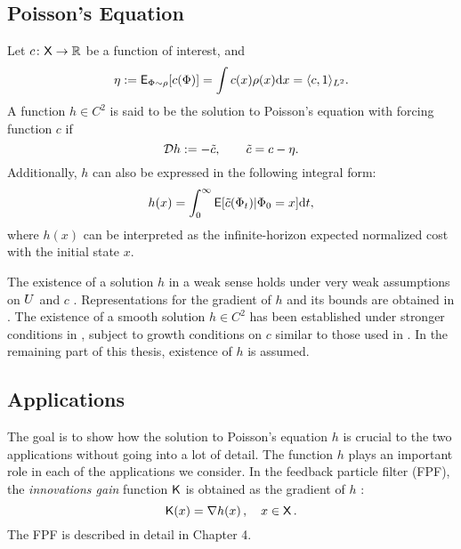 \subsection{Poisson's Equation}
Let $c \colon {\sf X} \to \mathbb{R}$ be a function of interest, and 
\begin{equation}
\eta := {\sf E}_{\Phi \sim \rho}[c(\Phi)] =  \int c(x) \rho(x) \text{d} x = \langle c, 1 \rangle_{L^2}.
\end{equation}
A function $h\in C^2$ is said to be the solution to Poisson's equation with forcing function $c$ if
\begin{equation}
\generate h := - \tilc, \qquad  \tilc = c - \eta.
\label{e:poissons}
\end{equation}
Additionally, $h$ can also be expressed in the following integral form:
\begin{equation}
h(x) =\int_0^\infty {\sf E}[\tilde c(\Phi_t)|\Phi_0 = x] \text{d} t,
\end{equation}
where $h(x)$ can be interpreted as the infinite-horizon expected normalized cost with the initial state $x$. 

The existence of a solution $h$ in a weak sense holds under very weak assumptions on $U$ and $c$  \cite{glymey96a,konmey12a}.   Representations for the gradient of $h$ and its bounds are obtained in \cite{laumehmeyrag15,devkonmey17b}.   The existence of  a  smooth solution $h\in C^2$ has been established under stronger conditions in \cite{parver01}, subject to growth conditions on $c$ similar to those used in  \cite{glymey96a}. In the remaining part of this thesis, existence of $h$ is assumed. 

\subsection{Applications} 
The goal is to show how the solution to Poisson's equation $h$ is crucial to the two applications without going into a lot of detail.  
The function $h$ plays an important role in each of the applications we consider. In the feedback particle filter (FPF), the \textit{innovations gain} function $\text{\sf K}$ is obtained as  the gradient of $h$ \cite{yanmehmey13}:
\begin{equation}
\kFPF (x) = \nabla h(x)\, ,  \quad x\in\state\, .
\label{e:fpfgain}
\end{equation}
The FPF is described in detail in Chapter 4. %

